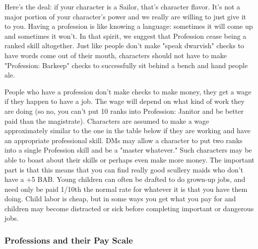 Here's the deal: if your character is a Sailor, that's character flavor. It's not a major portion of your character's power and we really are willing to just give it to you. Having a profession is like knowing a language: sometimes it will come up and sometimes it won't. In that spirit, we suggest that Profession cease being a ranked skill altogether. Just like people don't make "speak dwarvish" checks to have words come out of their mouth, characters should not have to make "Profession: Barkeep" checks to successfully sit behind a bench and hand people ale.

People who have a profession don't make checks to make money, they get a wage if they happen to have a job. The wage will depend on what kind of work they are doing (so no, you can't put 10 ranks into Profession: Janitor and be better paid than the magistrate). Characters are assumed to make a wage approximately similar to the one in the table below if they are working and have an appropriate professional skill. DMs may allow a character to put two ranks into a single Profession skill and be a "master whatever."  Such characters may be able to boast about their skills or perhaps even make more money. The important part is that this means that you can find really good scullery maids who don't have a +5 BAB. Young children can often be drafted to do grown-up jobs, and need only be paid 1/10th the normal rate for whatever it is that you have them doing. Child labor is cheap, but in some ways you get what you pay for and children may become distracted or sick before completing important or dangerous jobs.

\subsubsection{Professions and their Pay Scale}



